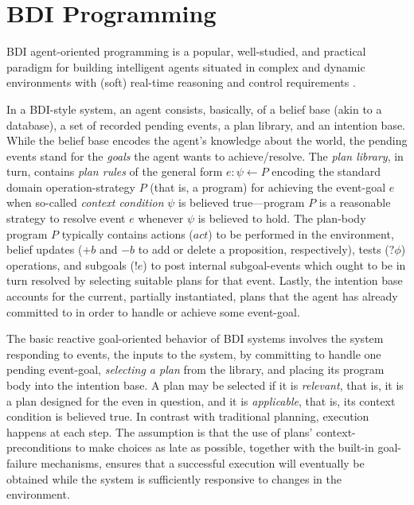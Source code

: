 \section{BDI Programming}\label{sec:preliminaries}

BDI agent-oriented programming is a popular, well-studied, and practical paradigm
for building intelligent agents situated in complex and dynamic environments with
(soft) real-time reasoning and control requirements
\cite{Georgeff89-PRS,Benfield:AAMAS06}.



In a BDI-style system, an agent consists, basically, of a belief base (akin
to a database), a set of recorded pending events, a plan library, and an
intention base. While the belief base encodes the agent's knowledge about the world, the
pending events stand for the \emph{goals} the agent wants to achieve/resolve. 
%
The \textit{plan library}, in turn, contains \emph{plan rules} of the general 
form $e: \psi \leftarrow P$ encoding the standard domain operation-strategy $P$
(that is, a program) for achieving the event-goal $e$ when so-called \textit{context condition}
$\psi$ is believed true---program $P$ is a reasonable strategy to resolve event $e$ whenever $\psi$
is believed to hold.
%
The plan-body program $P$ typically contains actions ($act$) to be performed in the environment,
belief updates ($+b$ and $-b$ to add or delete a proposition, respectively), tests ($?\phi$)
operations, and subgoals ($!e$) to post internal subgoal-events which ought to be in turn resolved
by selecting suitable plans for that event.
%
Lastly, the intention base accounts for the current, partially instantiated, plans
that the agent has already committed to in order to handle or achieve some event-goal.


The basic reactive goal-oriented behavior of BDI systems involves the system responding to
events, the inputs to the system, by committing to handle one pending event-goal, \textit{selecting
a plan} from the library, and placing its program body  into the intention base.
%
A plan may be selected if it is \textit{relevant}, that is, it is a plan designed for the even in
question, and it is \emph{applicable}, that is, its context condition is believed true.
%
In contrast with traditional planning, execution happens at each step. The assumption is that
the use of plans' context-preconditions to make choices as late as possible, together with
the built-in goal-failure mechanisms, ensures that a successful execution will eventually be
obtained while the system is sufficiently responsive to changes in the environment.


